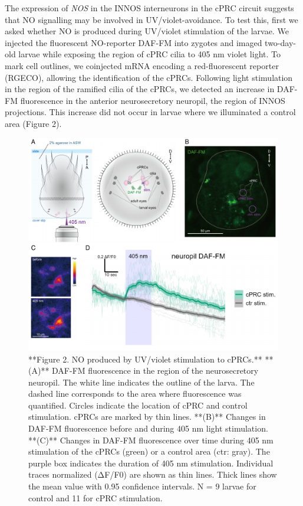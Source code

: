 \documentclass[
  10pt,
  onecolumn]{article}
\begin{document}
The expression of \emph{NOS} in the INNOS interneurons in the cPRC
circuit suggests that NO signalling may be involved in
UV/violet-avoidance. To test this, first we asked whether NO is produced
during UV/violet stimulation of the larvae. We injected the fluorescent
NO-reporter DAF-FM into zygotes and imaged two-day-old larvae while
exposing the region of cPRC cilia to 405 nm violet light. To mark cell
outlines, we coinjected mRNA encoding a red-fluorescent reporter
(RGECO), allowing the identification of the cPRCs. Following light
stimulation in the region of the ramified cilia of the cPRCs, we
detected an increase in DAF-FM fluorescence in the anterior
neurosecretory neuropil, the region of INNOS projections. This increase
did not occur in larvae where we illuminated a control area (Figure 2).

\begin{figure}
\includegraphics[width=29.17in]{figures/Fig2} \caption{**Figure 2. NO produced by UV/violet stimulation to cPRCs.** **(A)** DAF-FM fluorescence in the region of the neurosecretory neuropil. The white line indicates the outline of the larva. The dashed line corresponds to the area where fluorescence was quantified. Circles indicate the location of cPRC and control stimulation. cPRCs are marked by thin lines. **(B)** Changes in DAF-FM fluorescence before and during 405 nm light stimulation. **(C)** Changes in DAF-FM fluorescence over time during 405 nm stimulation of the cPRCs (green) or a control area (ctr: gray). The purple box indicates the duration of 405 nm stimulation. Individual traces normalized (ΔF/F0) are shown as thin lines. Thick lines show the mean value with 0.95 confidence intervals. N = 9 larvae for control and 11 for cPRC stimulation.}\label{fig:unnamed-chunk-2}
\end{figure}
\end{document}

